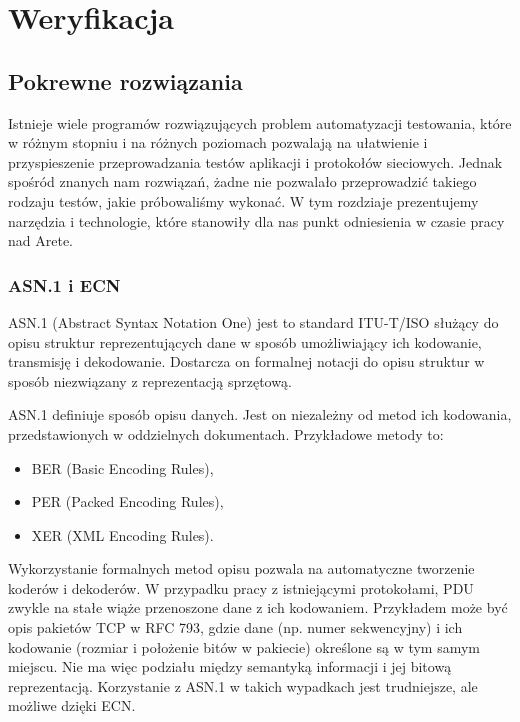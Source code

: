 \documentclass[00-praca-magisterska.tex]{subfiles}
\begin{document}
\chapter{Weryfikacja}


\section{Pokrewne rozwiązania}
\label{dostepne-rozwiazania}

Istnieje wiele programów rozwiązujących problem automatyzacji testowania, które
w różnym stopniu i na różnych poziomach pozwalają na ułatwienie i przyspieszenie
przeprowadzania testów aplikacji i protokołów sieciowych. Jednak spośród znanych
nam rozwiązań, żadne nie pozwalało przeprowadzić takiego rodzaju testów, jakie
próbowaliśmy wykonać. W tym rozdziaje prezentujemy narzędzia i technologie,
które stanowiły dla nas punkt odniesienia w czasie pracy nad Arete.

\subsection{ASN.1 i ECN}
\label{asn}
ASN.1 (Abstract Syntax Notation One) jest to standard ITU-T/ISO służący do opisu
struktur reprezentujących dane w sposób umożliwiający ich kodowanie, transmisję
i dekodowanie. Dostarcza on formalnej notacji do opisu struktur w sposób
niezwiązany z reprezentacją sprzętową.

ASN.1 definiuje sposób opisu danych. Jest on niezależny od metod ich kodowania,
przedstawionych w oddzielnych dokumentach. Przykładowe metody to:
\begin{itemize}
\item BER (Basic Encoding Rules),
\item PER (Packed Encoding Rules),
\item XER (XML Encoding Rules).
\end{itemize}

Wykorzystanie formalnych metod opisu pozwala na automatyczne tworzenie koderów i
dekoderów. W przypadku pracy z istniejącymi protokołami, PDU zwykle na stałe
wiąże przenoszone dane z ich kodowaniem. Przykładem może być opis pakietów TCP w
RFC 793, gdzie dane (np. numer sekwencyjny) i ich kodowanie (rozmiar i
położenie bitów w pakiecie) określone są w tym samym miejscu. Nie ma więc
podziału między semantyką informacji i jej bitową reprezentacją. Korzystanie z
ASN.1 w takich wypadkach jest trudniejsze, ale możliwe dzięki ECN.
\end{document}
